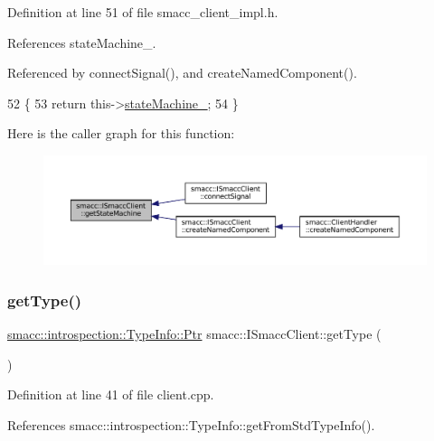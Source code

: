 Definition at line 51 of file smacc\+\_\+client\+\_\+impl.\+h.



References state\+Machine\+\_\+.



Referenced by connect\+Signal(), and create\+Named\+Component().


\begin{DoxyCode}
52 \{
53     \textcolor{keywordflow}{return} this->\hyperlink{classsmacc_1_1ISmaccClient_a926e4f2ae796def63d48dca389a48c47}{stateMachine\_};
54 \}
\end{DoxyCode}
Here is the caller graph for this function\+:
\nopagebreak
\begin{figure}[H]
\begin{center}
\leavevmode
\includegraphics[width=350pt]{classsmacc_1_1ISmaccClient_aec51d4712404cb9882b86e4c854bb93a_icgraph}
\end{center}
\end{figure}
\mbox{\label{classsmacc_1_1ISmaccClient_ae7faf4e40510c73810e6b0ef9fec8f33}} 
\subsubsection{\texorpdfstring{get\+Type()}{getType()}}
{\footnotesize\ttfamily \hyperlink{classsmacc_1_1introspection_1_1TypeInfo_aa6ffd9c39811d59f7c771941b7fad860}{smacc\+::introspection\+::\+Type\+Info\+::\+Ptr} smacc\+::\+I\+Smacc\+Client\+::get\+Type (\begin{DoxyParamCaption}{ }\end{DoxyParamCaption})\hspace{0.3cm}{\ttfamily [virtual]}}



Definition at line 41 of file client.\+cpp.



References smacc\+::introspection\+::\+Type\+Info\+::get\+From\+Std\+Type\+Info().



